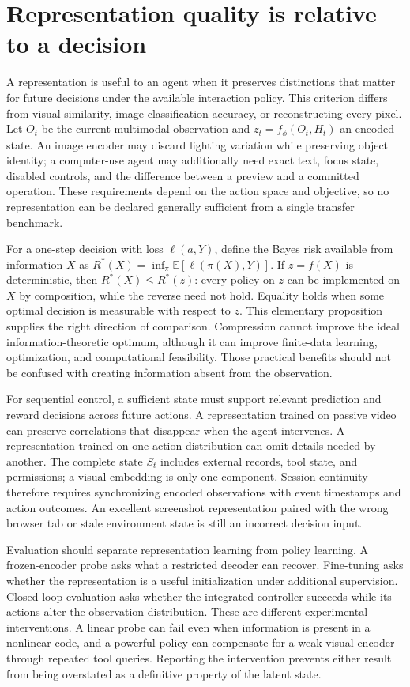\section{Representation quality is relative to a decision}
\label{sec:C05:sufficiency}
A representation is useful to an agent when it preserves distinctions that matter for future decisions under the available interaction policy. This criterion differs from visual similarity, image classification accuracy, or reconstructing every pixel. Let $O_t$ be the current multimodal observation and $z_t=f_\phi(O_t,H_t)$ an encoded state. An image encoder may discard lighting variation while preserving object identity; a computer-use agent may additionally need exact text, focus state, disabled controls, and the difference between a preview and a committed operation. These requirements depend on the action space and objective, so no representation can be declared generally sufficient from a single transfer benchmark.

For a one-step decision with loss $\ell(a,Y)$, define the Bayes risk available from information $X$ as $R^*(X)=\inf_\pi\mathbb E[\ell(\pi(X),Y)]$. If $z=f(X)$ is deterministic, then $R^*(X)\leq R^*(z)$: every policy on $z$ can be implemented on $X$ by composition, while the reverse need not hold. Equality holds when some optimal decision is measurable with respect to $z$. This elementary proposition supplies the right direction of comparison. Compression cannot improve the ideal information-theoretic optimum, although it can improve finite-data learning, optimization, and computational feasibility. Those practical benefits should not be confused with creating information absent from the observation.

For sequential control, a sufficient state must support relevant prediction and reward decisions across future actions. A representation trained on passive video can preserve correlations that disappear when the agent intervenes. A representation trained on one action distribution can omit details needed by another. The complete state $S_t$ includes external records, tool state, and permissions; a visual embedding is only one component. Session continuity therefore requires synchronizing encoded observations with event timestamps and action outcomes. An excellent screenshot representation paired with the wrong browser tab or stale environment state is still an incorrect decision input.

Evaluation should separate representation learning from policy learning. A frozen-encoder probe asks what a restricted decoder can recover. Fine-tuning asks whether the representation is a useful initialization under additional supervision. Closed-loop evaluation asks whether the integrated controller succeeds while its actions alter the observation distribution. These are different experimental interventions. A linear probe can fail even when information is present in a nonlinear code, and a powerful policy can compensate for a weak visual encoder through repeated tool queries. Reporting the intervention prevents either result from being overstated as a definitive property of the latent state.


